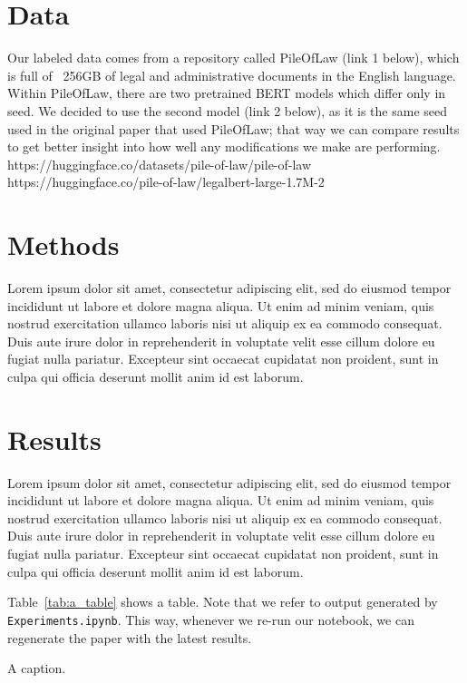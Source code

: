 \documentclass[11pt,a4paper]{article}
\begin{document}
\section{Data}

Our labeled data comes from a repository called PileOfLaw (link 1 below), which is full of ~256GB of legal and administrative documents in the English language.
Within PileOfLaw, there are two pretrained BERT models which differ only in seed. We decided to use the second model (link 2 below), as it is the same seed used in the original paper that used PileOfLaw; that way we can compare results to get better insight into how well any modifications we make are performing.
https://huggingface.co/datasets/pile-of-law/pile-of-law
https://huggingface.co/pile-of-law/legalbert-large-1.7M-2


\section{Methods}

Lorem ipsum dolor sit amet, consectetur adipiscing elit, sed do eiusmod tempor incididunt ut labore et dolore magna aliqua. Ut enim ad minim veniam, quis nostrud exercitation ullamco laboris nisi ut aliquip ex ea commodo consequat. Duis aute irure dolor in reprehenderit in voluptate velit esse cillum dolore eu fugiat nulla pariatur. Excepteur sint occaecat cupidatat non proident, sunt in culpa qui officia deserunt mollit anim id est laborum.



\section{Results}

Lorem ipsum dolor sit amet, consectetur adipiscing elit, sed do eiusmod tempor incididunt ut labore et dolore magna aliqua. Ut enim ad minim veniam, quis nostrud exercitation ullamco laboris nisi ut aliquip ex ea commodo consequat. Duis aute irure dolor in reprehenderit in voluptate velit esse cillum dolore eu fugiat nulla pariatur. Excepteur sint occaecat cupidatat non proident, sunt in culpa qui officia deserunt mollit anim id est laborum.


Table~\ref{tab:a_table} shows a table. Note that we refer to output generated by \texttt{Experiments.ipynb}. This way, whenever we re-run our notebook, we can regenerate the paper with the latest results.

\begin{table}[ht]
\centering

\caption{\label{tab:a_table} A caption. }
\end{table}
\end{document}
